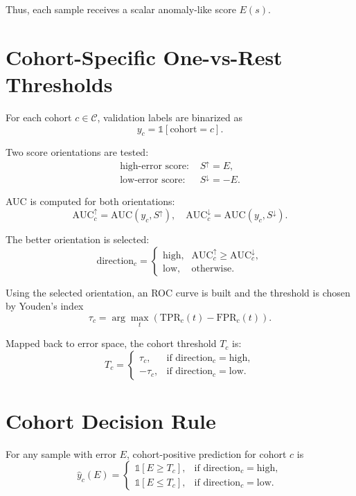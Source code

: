 \documentclass[11pt]{article}
\begin{document}
Thus, each sample receives a scalar anomaly-like score $E(s)$.

\section*{Cohort-Specific One-vs-Rest Thresholds}
For each cohort $c\in\mathcal{C}$, validation labels are binarized as
\[
y_c=\mathbb{1}[\text{cohort}=c].
\]

Two score orientations are tested:
\begin{align}
\text{high-error score: } &S^{\uparrow}=E, \\
\text{low-error score: } &S^{\downarrow}=-E.
\end{align}

AUC is computed for both orientations:
\[
\mathrm{AUC}^{\uparrow}_c=\mathrm{AUC}(y_c,S^{\uparrow}),
\quad
\mathrm{AUC}^{\downarrow}_c=\mathrm{AUC}(y_c,S^{\downarrow}).
\]

The better orientation is selected:
\[
\text{direction}_c=
\begin{cases}
\text{high}, & \mathrm{AUC}^{\uparrow}_c\ge \mathrm{AUC}^{\downarrow}_c,\\
\text{low}, & \text{otherwise}.
\end{cases}
\]

Using the selected orientation, an ROC curve is built and the threshold is chosen by Youden's index
\begin{equation}
\tau_c=\arg\max_t\left(\mathrm{TPR}_c(t)-\mathrm{FPR}_c(t)\right).
\end{equation}

Mapped back to error space, the cohort threshold $T_c$ is:
\begin{equation}
T_c=
\begin{cases}
\tau_c, & \text{if direction}_c=\text{high},\\
-\tau_c, & \text{if direction}_c=\text{low}.
\end{cases}
\end{equation}

\section*{Cohort Decision Rule}
For any sample with error $E$, cohort-positive prediction for cohort $c$ is
\begin{equation}
\hat{y}_c(E)=
\begin{cases}
\mathbb{1}[E\ge T_c], & \text{if direction}_c=\text{high},\\
\mathbb{1}[E\le T_c], & \text{if direction}_c=\text{low}.
\end{cases}
\end{equation}
\end{document}
